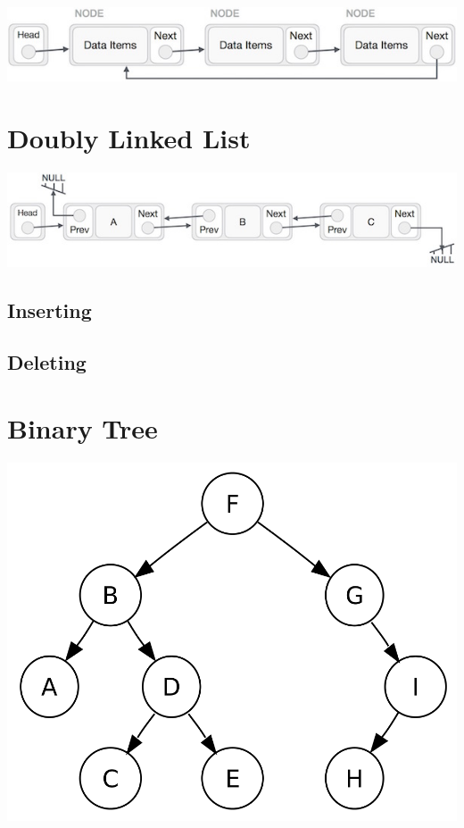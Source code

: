 \documentclass[11pt]{article}
\begin{document}
\begin{center}
    \includegraphics[width=350 px]{img/circularlinkedlist}  \\
\end{center}
\section{Doubly Linked List}
\begin{center}
    \includegraphics[width=350 px]{img/doublylinkedlist}  \\
\end{center}



\subsection{Inserting}



\subsection{Deleting}



\section{Binary Tree}
\begin{center}
    \includegraphics[width=250 px]{img/binarytree}  \\
\end{center}
\end{document}

